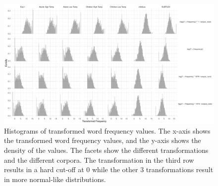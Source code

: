 \documentclass[doc, a4paper]{apa7}
\begin{document}
\begin{figure}[!htbp]
  \centerline{
    \includegraphics[width=\textwidth]{figures/histogram_plot_devel.pdf}}
    \caption{ Histograms of transformed word frequency values. The x-axis shows the transformed word frequency values, and the y-axis shows the density of the values. The facets show the different transformations and the different corpora. The transformation in the third row results in a hard cut-off at 0 while the other 3 transformations result in more normal-like distributions. }
    \label{fig:histogram_plot_devel}
\end{figure}

\clearpage
\end{document}

